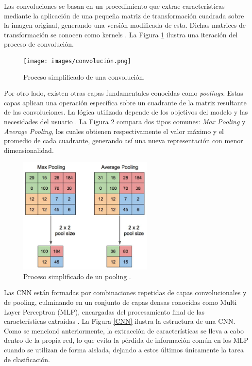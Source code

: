 Las convoluciones se basan en un procedimiento que extrae 
características mediante la aplicación de una pequeña matriz 
de transformación cuadrada sobre la imagen original, generando 
una versión modificada de esta. Dichas matrices de transformación 
se conocen como kernels \cite{Lecun2015}. La Figura 
\ref{convolucion} ilustra una iteración del proceso de 
convolución.\\

\begin{figure}[h!] 
    \texttt{[image: images/convolución.png]} 
    \centering 
    \caption[Proceso simplificado de una convolución]
    {Proceso simplificado de una convolución\protect \cite{convoluciones}.}
    \label{convolucion} 
\end{figure}

Por otro lado, existen otras capas fundamentales conocidas como 
\textit{poolings}. Estas 
capas aplican una operación específica sobre un cuadrante de la 
matriz resultante de las convoluciones. La lógica utilizada 
depende de los objetivos del modelo y las necesidades del 
usuario \cite{pooling}. La Figura \ref{pooling} compara dos 
tipos comunes: \textit{Max Pooling} y \textit{Average Pooling}, 
los cuales obtienen respectivamente el valor máximo y el 
promedio de cada cuadrante, generando así una nueva representación 
con menor dimensionalidad.\\

\begin{figure}[h!] 
    \includegraphics[width=0.6\textwidth]{images/pooling.png} 
    \centering 
    \caption[Proceso simplificado de un pooling]
    {Proceso simplificado de un pooling \protect \cite{pooling}.}
    \label{pooling} 
\end{figure}

Las CNN están formadas por combinaciones repetidas de capas 
convolucionales y de pooling, culminando en un conjunto de capas 
densas conocidas como Multi Layer Perceptron (MLP), encargadas 
del procesamiento final de las características extraídas 
\cite{Goodfellow-et-al-2016}. La Figura \ref{CNN} ilustra 
la estructura de una CNN. Como se mencionó anteriormente, la 
extracción de características se lleva a cabo dentro de la 
propia red, lo que evita la pérdida de información común en 
los MLP cuando se utilizan de forma aislada, dejando a estos 
últimos únicamente la tarea de clasificación.\\

